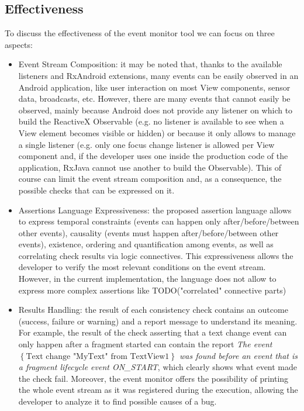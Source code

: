 \documentclass[11pt,a4paper,notitlepage]{article}
\begin{document}
{\subsection{Effectiveness}
To discuss the effectiveness of the event monitor tool we can focus on three aspects:
\begin{itemize}
	\item Event Stream Composition: it may be noted that, thanks to the available listeners and RxAndroid extensions, many events can be easily observed in an Android application, like user interaction on most View components, sensor data, broadcasts, etc. However, there are many events that cannot easily be observed, mainly because Android does not provide any listener on which to build the ReactiveX Observable (e.g. no listener is available to see when a View element becomes visible or hidden) or because it only allows to manage a single listener (e.g. only one focus change listener is allowed per View component and, if the developer uses one inside the production code of the application, RxJava cannot use another to build the Observable). This of course can limit the event stream composition and, as a consequence, the possible checks that can be expressed on it.
	\item Assertions Language Expressiveness: the proposed assertion language allows to express temporal constraints (events can happen only after/before/between other events), causality (events must happen after/before/between other events), existence, ordering and quantification among events, as well as correlating check results via logic connectives. This expressiveness allows the developer to verify the most relevant conditions on the event stream. However, in the current implementation, the language does not allow to express more complex assertions like TODO("correlated" connective parts)
	\item Results Handling: the result of each consistency check contains an outcome (success, failure or warning) and a report message to understand its meaning. For example, the result of the check asserting that a text change event can only happen after a fragment started can contain the report \textit{The event $\left\{\mbox{Text change "MyText" from TextView1}\right\}$ was found before an event that is a fragment lifecycle event ON\_START}, which clearly shows what event made the check fail. Moreover, the event monitor offers the possibility of printing the whole event stream as it was registered during the execution, allowing the developer to analyze it to find possible causes of a bug.
\end{itemize}

}
\end{document}
